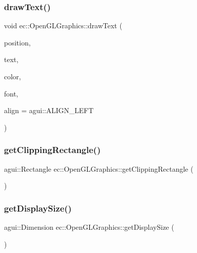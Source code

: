 \subsubsection{\texorpdfstring{draw\+Text()}{drawText()}}
{\footnotesize\ttfamily void ec\+::\+Open\+G\+L\+Graphics\+::draw\+Text (\begin{DoxyParamCaption}\item[{const agui\+::\+Point \&}]{position,  }\item[{const char $\ast$}]{text,  }\item[{const agui\+::\+Color \&}]{color,  }\item[{const agui\+::\+Font $\ast$}]{font,  }\item[{agui\+::\+Alignment\+Enum}]{align = {\ttfamily agui\+:\+:ALIGN\+\_\+LEFT} }\end{DoxyParamCaption})\hspace{0.3cm}{\ttfamily [override]}}

\mbox{\label{classec_1_1_open_g_l_graphics_ab32accb99490952a35fd1cb6a74d3716}} 
\subsubsection{\texorpdfstring{get\+Clipping\+Rectangle()}{getClippingRectangle()}}
{\footnotesize\ttfamily agui\+::\+Rectangle ec\+::\+Open\+G\+L\+Graphics\+::get\+Clipping\+Rectangle (\begin{DoxyParamCaption}{ }\end{DoxyParamCaption})\hspace{0.3cm}{\ttfamily [override]}}

\mbox{\label{classec_1_1_open_g_l_graphics_afc8287989607af54b43eae71ddcd259e}} 
\subsubsection{\texorpdfstring{get\+Display\+Size()}{getDisplaySize()}}
{\footnotesize\ttfamily agui\+::\+Dimension ec\+::\+Open\+G\+L\+Graphics\+::get\+Display\+Size (\begin{DoxyParamCaption}{ }\end{DoxyParamCaption})\hspace{0.3cm}{\ttfamily [override]}}

